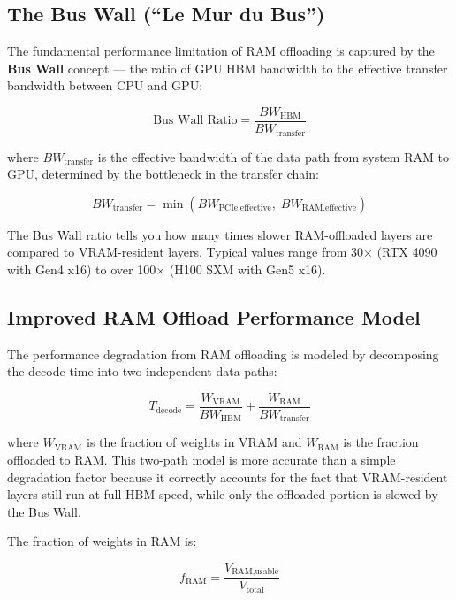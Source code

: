 \documentclass[11pt,a4paper]{article}
\theoremstyle{definition}
\begin{document}
\subsection{The Bus Wall (``Le Mur du Bus'')}

The fundamental performance limitation of RAM offloading is captured by the \textbf{Bus Wall} concept --- the ratio of GPU HBM bandwidth to the effective transfer bandwidth between CPU and GPU:

\begin{equation}\label{eq:buswall}
\text{Bus Wall Ratio} = \frac{BW_{\text{HBM}}}{BW_{\text{transfer}}}
\end{equation}

where $BW_{\text{transfer}}$ is the effective bandwidth of the data path from system RAM to GPU, determined by the bottleneck in the transfer chain:

\begin{equation}\label{eq:transferbw}
BW_{\text{transfer}} = \min(BW_{\text{PCIe,effective}}, \; BW_{\text{RAM,effective}})
\end{equation}

The Bus Wall ratio tells you how many times slower RAM-offloaded layers are compared to VRAM-resident layers. Typical values range from 30$\times$ (RTX 4090 with Gen4 x16) to over 100$\times$ (H100 SXM with Gen5 x16).

\subsection{Improved RAM Offload Performance Model}

The performance degradation from RAM offloading is modeled by decomposing the decode time into two independent data paths:

\begin{equation}\label{eq:offload_decode}
T_{\text{decode}} = \frac{W_{\text{VRAM}}}{BW_{\text{HBM}}} + \frac{W_{\text{RAM}}}{BW_{\text{transfer}}}
\end{equation}

where $W_{\text{VRAM}}$ is the fraction of weights in VRAM and $W_{\text{RAM}}$ is the fraction offloaded to RAM. This two-path model is more accurate than a simple degradation factor because it correctly accounts for the fact that VRAM-resident layers still run at full HBM speed, while only the offloaded portion is slowed by the Bus Wall.

The fraction of weights in RAM is:

\begin{equation}\label{eq:ramfraction}
f_{\text{RAM}} = \frac{V_{\text{RAM,usable}}}{V_{\text{total}}}
\end{equation}
\end{document}
